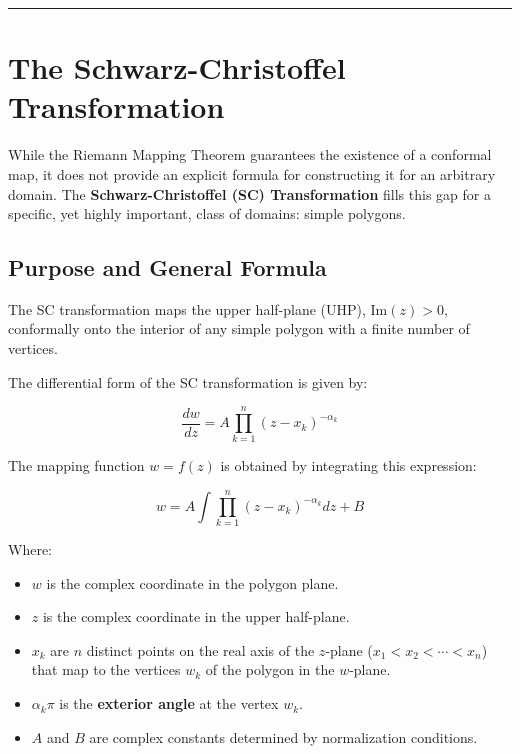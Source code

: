 \documentclass[12pt,a4paper]{article}
\begin{document}
\begin{center}\rule{0.5\linewidth}{0.5pt}\end{center}

\newpage
\section{The Schwarz-Christoffel
Transformation}\label{the-schwarz-christoffel-transformation-1}

While the Riemann Mapping Theorem guarantees the existence of a
conformal map, it does not provide an explicit formula for constructing
it for an arbitrary domain. The \textbf{Schwarz-Christoffel (SC)
Transformation} fills this gap for a specific, yet highly important,
class of domains: simple polygons.

\subsection{Purpose and General
Formula}\label{purpose-and-general-formula}

The SC transformation maps the upper half-plane (UHP),
\(\text{Im}(z) > 0\), conformally onto the interior of any simple
polygon with a finite number of vertices.

The differential form of the SC transformation is given by:

\begin{formulabox}
\[\frac{dw}{dz} = A \prod_{k=1}^{n} (z - x_k)^{-\alpha_k}\]
\end{formulabox}

The mapping function \(w = f(z)\) is obtained by integrating this
expression:

\begin{formulabox}
\[w = A \int \prod_{k=1}^{n} (z - x_k)^{-\alpha_k} dz + B\]
\end{formulabox}

Where:
\begin{itemize}
\item \(w\) is the complex coordinate in the polygon plane.
\item \(z\) is the complex coordinate in the upper half-plane.
\item \(x_k\) are
\(n\) distinct points on the real axis of the \(z\)-plane
(\(x_1 < x_2 < \cdots < x_n\)) that map to the vertices \(w_k\) of the
polygon in the \(w\)-plane.
\item \(\alpha_k \pi\) is the \textbf{exterior
angle} at the vertex \(w_k\).
\item \(A\) and \(B\) are complex constants
determined by normalization conditions.
\end{itemize}
\end{document}
